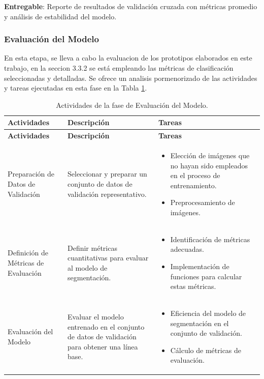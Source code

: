  \textbf{Entregable}: Reporte de resultados de validación cruzada con métricas promedio y análisis de estabilidad del modelo.

\subsubsection{Evaluación del Modelo}
En esta etapa, se lleva a cabo la evaluacion de los prototipos elaborados en este trabajo, en la seccion 3.3.2 se está empleando las métricas de clasificación seleccionadas y detalladas. Se ofrece un analisis pormenorizado de las actividades y tareas ejecutadas en esta fase en la Tabla \ref{tabla:evaluacion_modelo}.

\vspace{2ex}
 \begingroup
 \renewcommand\arraystretch{1.2}
 \begin{longtable}{p{4cm} p{6cm} p{6cm}}
 \caption{Actividades de la fase de Evaluación del Modelo.}
 \label{tabla:evaluacion_modelo}\\
 \toprule
 \textbf{Actividades} & \textbf{Descripción} & \textbf{Tareas} \\
 \midrule
 \endfirsthead
 
 \toprule
 \textbf{Actividades} & \textbf{Descripción} & \textbf{Tareas} \\
 \midrule
 \endhead
 
 \bottomrule
 \endfoot
 
 Preparación de Datos de Validación & Seleccionar y preparar un conjunto de datos de validación representativo. & 
 \begin{itemize}
     \item Elección de imágenes que no hayan sido empleados en el proceso de entrenamiento.
     \item Preprocesamiento de imágenes.
 \end{itemize} \\
 
 Definición de Métricas de Evaluación & Definir métricas cuantitativas para evaluar al modelo de segmentación. & 
 \begin{itemize}
     \item Identificación de métricas adecuadas.
     \item Implementación de funciones para calcular estas métricas.
 \end{itemize} \\
 
 Evaluación del Modelo & Evaluar el modelo entrenado en el conjunto de datos de validación para obtener una línea base. & 
 \begin{itemize}
     \item Eficiencia del modelo de segmentación en el conjunto de validación.
     \item Cálculo de métricas de evaluación.
 \end{itemize} \\
 
 \end{longtable}
 \endgroup

